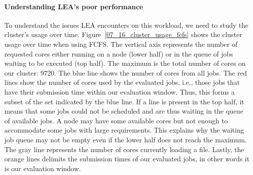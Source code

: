 \documentclass[sigconf,review,anonymous]{acmart}
\begin{document}
\paragraph{Understanding LEA's poor performance}
To understand the issues LEA encounters on this workload, we need to study the cluster's usage over time.
Figure~\ref{07_16_cluster_usage_fcfs} shows the cluster usage over time when using FCFS.
The vertical axis represents the number of requested cores either running on a
node (lower half) or in the queue of jobs waiting to be executed (top
half). The maximum is the total number of cores on our cluster: 9720.
The blue line shows the number of cores from all jobs.
The red lines show the number of cores used by the evaluated jobs, i.e.,
those jobs that have their submission time within our evaluation window. Thus, this forms a subset
of the set indicated by the blue line.
If a line is present in the top half, it means that some jobs could not be scheduled
and are thus waiting in the queue of available jobs. 
A node may have some available cores but not enough to accommodate some jobs with large requirements.
This explains why the waiting job queue may not be empty even if the lower half does not reach the maximum.
The gray line represents the number of cores currently loading a file.
Lastly, the orange lines delimits the submission times of our 
evaluated jobs, in other words it is our evaluation window.
\end{document}
